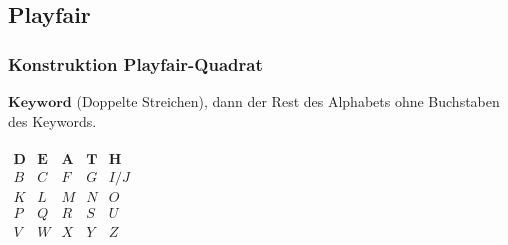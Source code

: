 \documentclass[10pt]{article}
\begin{document}
\subsection{Playfair}
\subsubsection{Konstruktion Playfair-Quadrat}
$\mathbf{Keyword}$ (Doppelte Streichen), dann der Rest des Alphabets ohne Buchstaben des Keywords.\\\\
$\begin{matrix}
\mathbf{D} & \mathbf{E} & \mathbf{A} & \mathbf{T} & \mathbf{H} \\
B & C & F & G & I/J \\
K & L & M & N & O \\
P & Q & R & S & U \\
V & W & X & Y & Z \\
\end{matrix}$
\end{document}
